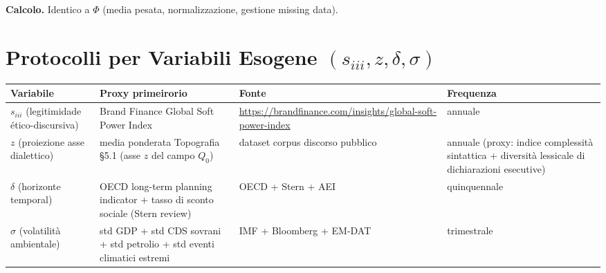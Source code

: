 \Hypoth{} \textbf{Calcolo.} Identico a \(\Phi\) (media pesata,
normalizzazione, gestione missing data).



\section{\texorpdfstring{Protocolli per Variabili Esogene
\((s_{iii}, z, \delta, \sigma)\)}{Protocolli per Variabili Esogene (s\_\{iii\}, z, \textbackslash delta, \textbackslash sigma)}}\label{protocolli-per-variáveis-esogene-s_iii-z-delta-sigma}

{\def\LTcaptype{none} %
{\small\begin{longtable}[]{@{}
  >{\raggedright\arraybackslash}p{}
  >{\raggedright\arraybackslash}p{}
  >{\raggedright\arraybackslash}p{}
  >{\raggedright\arraybackslash}p{}@{}}
\toprule\noalign{}
\begin{minipage}[b]{\linewidth}\raggedright
Variabile
\end{minipage} & \begin{minipage}[b]{\linewidth}\raggedright
Proxy primeirorio
\end{minipage} & \begin{minipage}[b]{\linewidth}\raggedright
Fonte
\end{minipage} & \begin{minipage}[b]{\linewidth}\raggedright
Frequenza
\end{minipage} \\
\midrule\noalign{}
\endhead
\bottomrule\noalign{}
\endlastfoot
\(s_{iii}\) (legitimidade ético-discursiva) & Brand Finance Global Soft
Power Index &
\url{https://brandfinance.com/insights/global-soft-power-index} &
annuale \\
\(z\) (proiezione asse dialettico) & media ponderata Topografia \S{}5.1
(asse \(z\) del campo \(Q_0\)) & dataset corpus discorso pubblico &
annuale (proxy: indice complessità sintattica + diversità lessicale di
dichiarazioni esecutive) \\
\(\delta\) (horizonte temporal) & OECD long-term planning indicator +
tasso di sconto sociale (Stern review) & OECD + Stern + AEI &
quinquennale \\
\(\sigma\) (volatilità ambientale) & std GDP + std CDS sovrani + std
petrolio + std eventi climatici estremi & IMF + Bloomberg + EM-DAT &
trimestrale \\
\end{longtable}}
}


